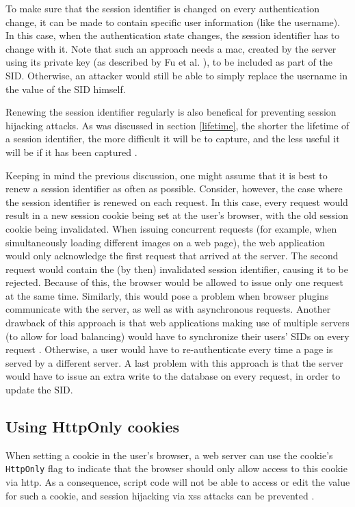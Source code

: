 To make sure that the session identifier is changed on every authentication change, it can be made to contain specific user information (like the username). In this case, when the authentication state changes, the session identifier has to change with it. Note that such an approach needs a \gls{mac}, created by the server using its private key (as described by Fu et al. \cite{Fu2001}), to be included as part of the SID. Otherwise, an attacker would still be able to simply replace the username in the value of the SID himself.

Renewing the session identifier regularly is also benefical for preventing session hijacking attacks. As was discussed in section \ref{lifetime}, the shorter the lifetime of a session identifier, the more difficult it will be to capture, and the less useful it will be if it has been captured \cite{Fu2001}.

Keeping in mind the previous discussion, one might assume that it is best to renew a session identifier as often as possible. Consider, however, the case where the session identifier is renewed on each request. In this case, every request would result in a new session cookie being set at the user's browser, with the old session cookie being invalidated. When issuing concurrent requests (for example, when simultaneously loading different images on a web page), the web application would only acknowledge the first request that arrived at the server. The second request would contain the (by then) invalidated session identifier, causing it to be rejected. Because of this, the browser would be allowed to issue only one request at the same time. Similarly, this would pose a problem when browser plugins communicate with the server, as well as with asynchronous requests. Another drawback of this approach is that web applications making use of multiple servers (to allow for load balancing) would have to synchronize their users' SIDs on every request \cite{Dacosta2011}. Otherwise, a user would have to re-authenticate every time a page is served by a different server. A last problem with this approach is that the server would have to issue an extra write to the database on every request, in order to update the SID.

\subsection{Using HttpOnly cookies}\label{httponly}

When setting a cookie in the user's browser, a web server can use the cookie's \texttt{HttpOnly} flag to indicate that the browser should only allow access to this cookie via \gls{http}. As a consequence, script code will not be able to access or edit the value for such a cookie, and session hijacking via \gls{xss} attacks can be prevented \cite{HttpOnly}.

